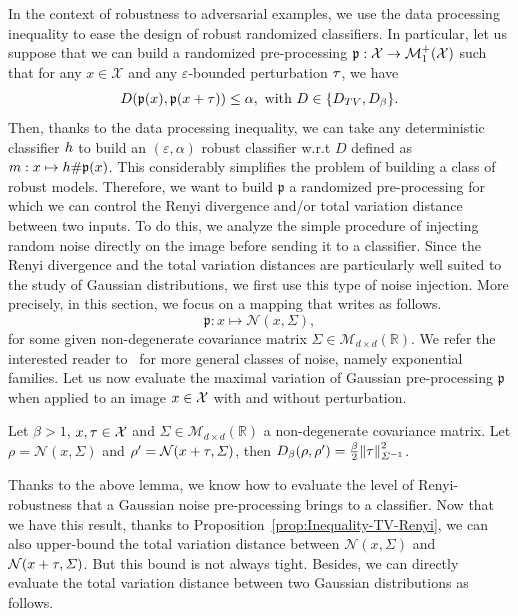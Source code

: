 In the context of robustness to adversarial examples, we use the data processing inequality to ease the design of robust randomized classifiers. In particular, let us suppose that we can build a randomized pre-processing $\mathfrak{p}: \XX \rightarrow \mathcal{M}^+_1\left( \XX \right)$ such that for any $x  \in \mathcal{X}$ and any $\varepsilon$-bounded perturbation ${\tau}$, we have 
\begin{equation}
   D\left(\mathfrak{p}(x ), \mathfrak{p}(x  + \perturb) \right) \leq \alpha,
\text{ with }D \in  \{D_{TV}, D_\beta \}. 
\end{equation}
Then, thanks to the data processing inequality, we can take any deterministic classifier ${h}$ to build an $(\varepsilon,\alpha)$ robust classifier w.r.t $D$ defined as $m  : x  \mapsto  {h} \# \mathfrak{p}(x )$. This considerably simplifies the problem of building a class of robust models. Therefore, we want to build $\mathfrak{p}$ a randomized pre-processing for which we can control the Renyi divergence and/or total variation distance between two inputs. To do this, we analyze the simple procedure of injecting random noise directly on the image before sending it to a classifier. Since the Renyi divergence and the total variation distances are particularly well suited to the study of Gaussian distributions, we first use this type of noise injection. More precisely, in this section, we focus on a mapping that writes as follows.
\begin{equation}
    \mathfrak{p}: x  \mapsto \mathcal{N}\left(x , \Sigma \right),
\end{equation}
for some given non-degenerate covariance matrix $\Sigma \in \mathcal{M}_{d\times d}(\mathbb{R})$.
We refer the interested reader to~\cite{pinot2019theoretical} for more general classes of noise, namely exponential families. 
Let us now evaluate the maximal variation of Gaussian pre-processing $\mathfrak{p}$ when applied to an image $x \in \mathcal{X}$ with and without perturbation. 

\begin{lemma}
\label{gaussRenyi} Let $\beta>1$, $x , {\tau} \in \mathcal{X}$ and $\Sigma \in \mathcal{M}_{d \times d}(\mathbb{R})$ a non-degenerate covariance matrix. Let $\rho = \mathcal{N}(x ,\Sigma)$ and $\rho'=\mathcal{N}(x  + {\tau},\Sigma)$, then $D_{\beta}(\rho,\rho') = \frac{ \beta }{2} \norm{{\tau}}_{\Sigma^{- 1}}^2 $.
\end{lemma}


Thanks to the above lemma, we know how to evaluate the level of Renyi-robustness that a Gaussian noise pre-processing brings to a classifier. Now that we have this result, thanks to Proposition~\ref{prop:Inequality-TV-Renyi}, we can also upper-bound the total variation distance between $\mathcal{N}(x ,\Sigma)$ and $\mathcal{N}(x  + {\tau},\Sigma)$. But this bound is not always tight. Besides, we can directly evaluate the total variation distance between two Gaussian distributions as follows.

